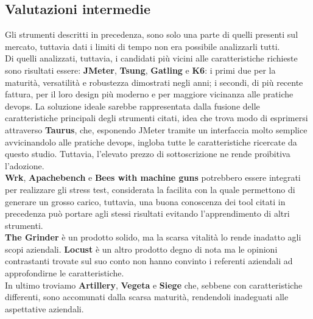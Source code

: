\subsection{Valutazioni intermedie}
Gli strumenti descritti in precedenza, sono solo una parte di quelli presenti sul mercato, tuttavia dati i limiti di tempo non era possibile analizzarli tutti. \\
Di quelli analizzati, tuttavia, i candidati più vicini alle caratteristiche richieste sono risultati essere: \textbf{JMeter}, \textbf{Tsung}, \textbf{Gatling} e \textbf{K6}: i primi due per la maturità, versatilità e robustezza dimostrati negli anni; i secondi, di più recente fattura, per il loro design più moderno e per maggiore vicinanza alle pratiche \gls{devops}.
La soluzione ideale sarebbe rappresentata dalla fusione delle caratteristiche principali degli strumenti citati, idea che trova modo di esprimersi attraverso \textbf{Taurus}, che, esponendo JMeter tramite un interfaccia molto semplice avvicinandolo alle pratiche \gls{devops}, ingloba tutte le caratteristiche ricercate da questo studio. Tuttavia, l'elevato prezzo di sottoscrizione ne rende proibitiva l'adozione. \\
\textbf{Wrk}, \textbf{Apachebench} e \textbf{Bees with machine guns} potrebbero essere integrati per realizzare gli stress test, considerata la facilita con la quale permettono di generare un grosso carico, tuttavia, una buona conoscenza dei tool citati in precedenza può portare agli stessi risultati evitando l'apprendimento di altri strumenti. \\
\textbf{The Grinder} è un prodotto solido, ma la scarsa vitalità lo rende inadatto agli scopi aziendali.
\textbf{Locust} è un altro prodotto degno di nota ma le opinioni contrastanti trovate sul suo conto non hanno convinto i referenti aziendali ad approfondirne le caratteristiche. \\
In ultimo troviamo \textbf{Artillery}, \textbf{Vegeta} e \textbf{Siege} che, sebbene con caratteristiche differenti, sono accomunati dalla scarsa maturità, rendendoli inadeguati alle aspettative aziendali.
\newpage
